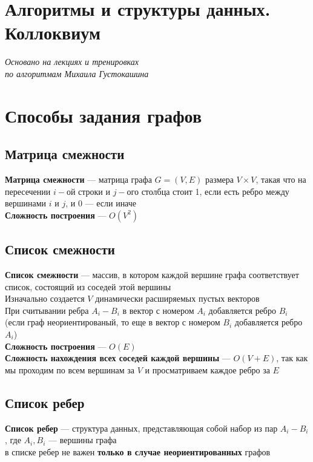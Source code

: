 \documentclass[a4paper]{article}
\begin{document}
\section*{\LARGE{Алгоритмы и структуры данных. Коллоквиум}}
\begin{flushright}
    \textit{Основано на лекциях и тренировках}\\ 
    \textit{по алгоритмам Михаила Густокашина}
\end{flushright}
\tableofcontents
\newpage
\section{Способы задания графов}
\subsection{Матрица смежности}
\textbf{Матрица смежности} — матрица графа $G=(V,E)$ размера $V\times V$, такая что на пересечении $i-$ой строки и $j-$ого столбца стоит 1, если есть ребро между вершинами $i$ и $j$, и 0 — если иначе\\[2mm]
\indent\textbf{Сложность построения} — $O(V^2)$

\subsection{Список смежности}
\textbf{Список смежности} — массив, в котором каждой вершине графа соответствует список, состоящий из соседей этой вершины\\[2mm]
\indent Изначально создается $V$ динамически расширяемых пустых векторов\\[2mm]
\indent При считывании ребра $A_i-B_i$ в вектор с номером $A_i$ добавляется ребро $B_i$ (если граф неориентированый, то еще в вектор с номером $B_i$ добавляется ребро $A_i$)\\[2mm]
\indent\textbf{Сложность построения} — $O(E)$\\[2mm]
\indent\textbf{Сложность нахождения всех соседей каждой вершины} — $O(V+E)$, так как мы проходим по всем вершинам за $V$ и просматриваем каждое ребро за $E$

\subsection{Список ребер}
\textbf{Список ребер} — структура данных, представляющая собой набор из пар $A_i-B_i$, где $A_i,B_i$ — вершины графа\\[2mm]
 в списке ребер не важен \textbf{только в случае неориентированных} графов
\end{document}
